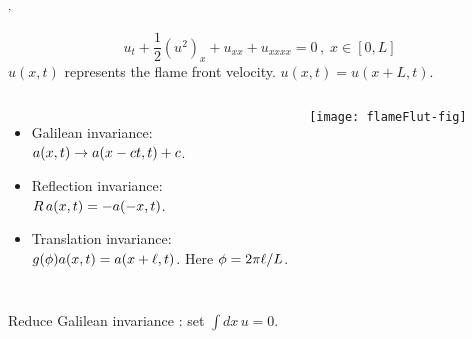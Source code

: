 \begin{frame}%
  \frametitle{\KSe  {}$^,$}


  \begin{equation}
    u_t+\frac{1}{2}(u^2)_x+u_{xx}+u_{xxxx}=0\,,\; x\in [0,L]
    \label{eq:ks}
  \end{equation}
  $u(x, t)$ represents the
  flame front velocity. $u(x, t) = u(x+L, t)$.

  \begin{columns}[c] %
    \begin{itemize}
    \item {\color{blue} Galilean invariance}: \\
      $a(x, t) \to a(x-ct,t)+c$.

    \item {\color{blue} Reflection invariance}:  \\
      $R\,a(x,t) = -a(-x,t)$. \\

    \item {\color{blue} Translation invariance}: \\
      $g({\bf \phi}) a(x, t) = a (x+\ell,t)$.
      Here ${\bf \phi} = 2\pi \ell/L$.  \\
    \end{itemize}


    \begin{center}
      \texttt{[image: flameFlut-fig]}
    \end{center}

  \end{columns}

  \begin{center}
    {\color{green}  Reduce Galilean invariance : set $\int dx\, u = 0$. }
  \end{center}



\end{frame}

